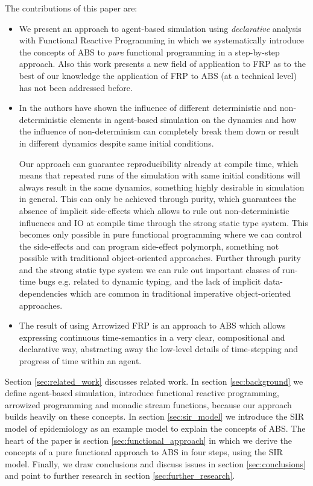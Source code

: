 The contributions of this paper are:
\begin{itemize}
	\item We present an approach to agent-based simulation using \textit{declarative} analysis with Functional Reactive Programming in which we systematically introduce the concepts of ABS to \textit{pure} functional programming in a step-by-step approach. Also this work presents a new field of application to FRP as to the best of our knowledge the application of FRP to ABS (at a technical level) has not been addressed before.
	
	\item In \cite{thaler_art_2017} the authors have shown the influence of different deterministic and non-deterministic elements in agent-based simulation on the dynamics and how the influence of non-determinism can completely break them down or result in different dynamics despite same initial conditions.
	
	Our approach can guarantee reproducibility already at compile time, which means that repeated runs of the simulation with same initial conditions will always result in the same dynamics, something highly desirable in simulation in general. This can only be achieved through purity, which guarantees the absence of implicit side-effects which allows to rule out non-deterministic influences and IO at compile time through the strong static type system. This becomes only possible in pure functional programming where we can control the side-effects and can program side-effect polymorph, something not possible with traditional object-oriented approaches. Further through purity and the strong static type system we can rule out important classes of run-time bugs e.g. related to dynamic typing, and the lack of implicit data-dependencies which are common in traditional imperative object-oriented approaches.
	
	\item The result of using Arrowized FRP is an approach to ABS which allows expressing continuous time-semantics in a very clear, compositional and declarative way, abstracting away the low-level details of time-stepping and progress of time within an agent.
\end{itemize}

Section \ref{sec:related_work} discusses related work. In section \ref{sec:background} we define agent-based simulation, introduce functional reactive programming, arrowized programming and monadic stream functions, because our approach builds heavily on these concepts. In section \ref{sec:sir_model} we introduce the SIR model of epidemiology as an example model to explain the concepts of ABS. The heart of the paper is section \ref{sec:functional_approach} in which we derive the concepts of a pure functional approach to ABS in four steps, using the SIR model. Finally, we draw conclusions and discuss issues in section \ref{sec:conclusions} and point to further research in section \ref{sec:further_research}.

